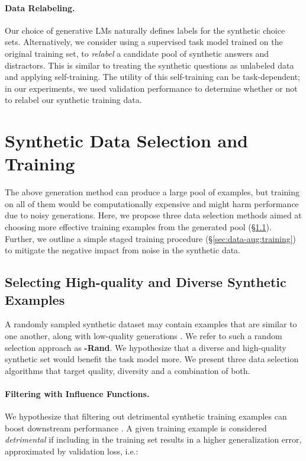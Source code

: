 \documentclass[11pt,a4paper]{article}
\newcommand{\gdaug}{}
\begin{document}
\paragraph{Data Relabeling.} 

Our choice of generative LMs naturally defines labels for the synthetic choice sets. 
Alternatively, we consider using a supervised task model trained on the original training set, to {\em relabel} a candidate pool of synthetic answers and distractors. 
This is similar to treating the synthetic questions as unlabeled data and applying self-training. 
The utility of this self-training can be task-dependent; in our experiments, we used validation performance to determine whether or not to relabel our synthetic training data.








 \section{Synthetic Data Selection and Training}
\label{sec:selection}


The above generation method can produce a large pool of examples, but training on all of them would be computationally expensive and might harm performance due to noisy generations. Here, we propose three data selection methods aimed at choosing more effective training examples from the generated pool (\S\ref{sec:data-aug:select}).
Further, we outline a simple staged training procedure (\S\ref{sec:data-aug:training}) to mitigate the negative impact from noise in the synthetic data.

\subsection{Selecting High-quality and Diverse Synthetic Examples }
\label{sec:data-aug:select}
A randomly sampled synthetic dataset may contain examples that are similar to one another, along with low-quality generations \cite{holtzman2019curious}. We refer to such a random selection approach as \textbf{\gdaug-Rand}. We hypothesize that a diverse and high-quality synthetic set would benefit the task model more. 
We present three data selection algorithms that target quality, diversity and a combination of both.  

\paragraph{Filtering with Influence Functions.}
We hypothesize that filtering out detrimental synthetic training examples can boost downstream performance \cite{bras2020adversarial}.
A given training example  is considered {\em detrimental} if including  in the training set results in a higher generalization error, approximated by validation loss, i.e.:
\end{document}
